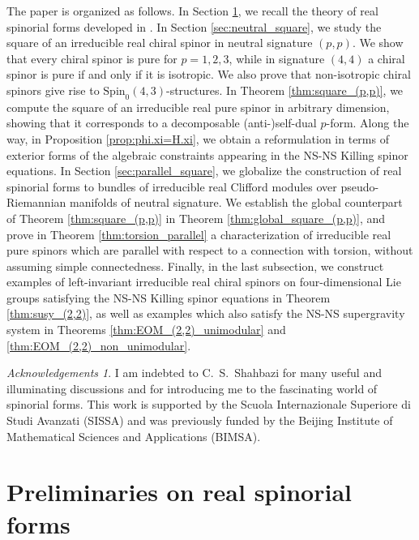 \documentclass[10pt,reqno]{amsart}
\theoremstyle{definition}
\theoremstyle{remark}
\newtheorem*{acknowledgements}{Acknowledgements}
\begin{document}
The paper is organized as follows. In Section \ref{sec:preliminaries}, we recall the theory of real spinorial forms developed in \cite{Cortes_Lazaroiu_Shahbazi2021}. In Section \ref{sec:neutral_square}, we study the square of an irreducible real chiral spinor in neutral signature $(p,p)$. We show that every chiral spinor is pure for $p=1,2,3$, while in signature $(4,4)$ a chiral spinor is pure if and only if it is isotropic. We also prove that non-isotropic chiral spinors give rise to $\mathrm{Spin}_0(4,3)$-structures. In Theorem \ref{thm:square_(p,p)}, we compute the square of an irreducible real pure spinor in arbitrary dimension, showing that it corresponds to a decomposable (anti-)self-dual $p$-form. Along the way, in Proposition \ref{prop:phi.xi=H.xi}, we obtain a reformulation in terms of exterior forms of the algebraic constraints appearing in the NS-NS Killing spinor equations. In Section \ref{sec:parallel_square}, we globalize the construction of real spinorial forms to bundles of irreducible real Clifford modules over pseudo-Riemannian manifolds of neutral signature. We establish the global counterpart of Theorem \ref{thm:square_(p,p)} in Theorem \ref{thm:global_square_(p,p)}, and prove in Theorem \ref{thm:torsion_parallel} a characterization of irreducible real pure spinors which are parallel with respect to a connection with torsion, without assuming simple connectedness. Finally, in the last subsection, we construct examples of left-invariant irreducible real chiral spinors on four-dimensional Lie groups satisfying the NS-NS Killing spinor equations in Theorem \ref{thm:susy_(2,2)}, as well as examples which also satisfy the NS-NS supergravity system in Theorems \ref{thm:EOM_(2,2)_unimodular} and \ref{thm:EOM_(2,2)_non_unimodular}.

\begin{acknowledgements}
    I am indebted to C.\ S.\ Shahbazi for many useful and illuminating discussions and for introducing me to the fascinating world of spinorial forms. This work is supported by the Scuola Internazionale Superiore di Studi Avanzati (SISSA) and was previously funded by the Beijing Institute of Mathematical Sciences and Applications (BIMSA).
\end{acknowledgements}


\section{Preliminaries on real spinorial forms}\label{sec:preliminaries}
\end{document}

